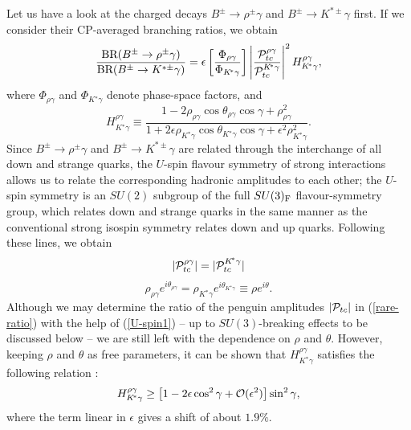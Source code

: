 \documentclass[12pt]{article}
\begin{document}
Let us have a look at the charged decays $B^\pm \to \rho^{\pm} \gamma$ 
and $B^\pm \to K^{\ast\pm} \gamma$ first. If we consider their 
CP-averaged branching ratios, we obtain
\begin{equation}\label{rare-ratio}
\frac{\mbox{BR}(B^\pm \to \rho^{\pm} 
\gamma)}{\mbox{BR}(B^\pm \to K^{\ast\pm} \gamma)}=\epsilon
\left[\frac{\Phi_{\rho\gamma}}{\Phi_{K\!^\ast\gamma}}\right]
\left|\frac{{\cal P}_{tc}^{\rho\gamma}}{{\cal P}_{tc}^{K\!^\ast\gamma}}
\right|^2 H^{\rho\gamma}_{K\!^\ast\gamma},
\end{equation}
where $\Phi_{\rho\gamma}$ and $\Phi_{K\!^\ast\gamma}$ denote phase-space 
factors, and 
\begin{equation}
H^{\rho\gamma}_{K\!^\ast\gamma}\equiv
\frac{1-2\rho_{\rho\gamma}\cos\theta_{\rho\gamma}\cos\gamma+
\rho_{\rho\gamma}^2}{1+2\epsilon\rho_{K\!^\ast\gamma}
\cos\theta_{K\!^\ast\gamma}
\cos\gamma+\epsilon^2\rho_{K\!^\ast\gamma}^2}.
\end{equation}
Since $B^\pm \to \rho^{\pm} \gamma$ and $B^\pm \to K^{\ast\pm} \gamma$ 
are related through the interchange of all down and strange quarks, 
the $U$-spin flavour symmetry of strong interactions allows us to relate 
the corresponding hadronic amplitudes to each other; the $U$-spin
symmetry is an $SU(2)$ subgroup of the full $SU(3)_{\rm F}$ flavour-symmetry
group, which relates down and strange quarks in the same manner as the 
conventional strong isospin symmetry relates down and up quarks. Following 
these lines, we obtain
\begin{equation}\label{U-spin1}
|{\cal P}_{tc}^{\rho\gamma}|=|{\cal P}_{tc}^{K\!^\ast\gamma}|
\end{equation}
\begin{equation}\label{U-spin2}
\rho_{\rho\gamma}e^{i\theta_{\rho\gamma}}=
\rho_{K\!^\ast\gamma}e^{i\theta_{K\!^\ast\gamma}}\equiv
\rho e^{i\theta}.
\end{equation}
Although we may determine the ratio of the penguin amplitudes 
$|{\cal P}_{tc}|$ in (\ref{rare-ratio}) with the help of  (\ref{U-spin1}) -- up to 
$SU(3)$-breaking effects to be discussed below -- we are still left
with the dependence on $\rho$ and $\theta$. However, keeping $\rho$ 
and $\theta$ as free parameters, it can be shown that
$H^{\rho\gamma}_{K\!^\ast\gamma}$ satisfies the following relation \cite{FR2}:
\begin{equation}\label{H-bound}
H^{\rho\gamma}_{K\!^\ast\gamma}\geq \left[1-2\epsilon
\cos^2\gamma+{\cal O}(\epsilon^2)\right]\sin^2\gamma,
\end{equation}
where the term linear in $\epsilon$ gives a shift of about $1.9\%$. 
\end{document}

